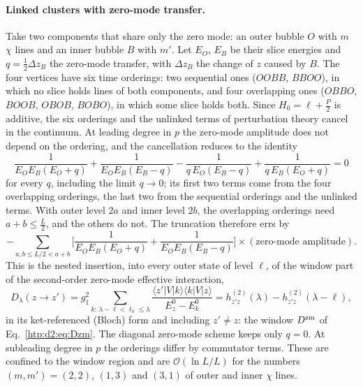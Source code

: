 \paragraph{Linked clusters with zero-mode transfer.} Take two components that share only the zero mode: an outer bubble $O$
with $m$ $\chi$ lines and an inner bubble $B$ with $m'$. Let $E_O$, $E_B$ be their slice energies and $q=\frac12\Delta z_B$ the
zero-mode transfer, with $\Delta z_B$ the change of $z$ caused by $B$. The four vertices
have six time orderings: two sequential ones ($OOBB$, $BBOO$), in which no slice holds lines of both components, and four
overlapping ones ($OBBO$, $BOOB$, $OBOB$, $BOBO$), in which some slice holds both. Since $H_0=\ell+\frac P2$ is additive, the
six orderings and the unlinked terms of perturbation theory cancel in the continuum. At leading degree in $p$ the zero-mode
amplitude does not depend on the ordering, and the cancellation reduces to the identity
\begin{equation}
 \frac1{E_OE_B(E_O+q)}+\frac1{E_OE_B(E_B-q)}-\frac1{q\,E_O(E_B-q)}+\frac1{q\,E_B(E_O+q)}=0
\end{equation}
for every $q$, including the limit $q\to0$; its first two terms come from the four overlapping orderings, the last two from
the sequential orderings and the unlinked terms. With outer level $2a$ and inner level $2b$, the overlapping orderings need
$a+b\le\frac L2$, and the others do not. The truncation therefore errs by
\begin{equation}
 -\sum_{a,b\le L/2<a+b}\Big[\frac1{E_OE_B(E_O+q)}+\frac1{E_OE_B(E_B-q)}\Big]\times(\text{zero-mode amplitude}).
\end{equation}
This is the nested insertion, into every outer state of level $\ell$, of the window part of the second-order zero-mode
effective interaction,
\begin{equation}
 D_\lambda(z\to z')=g_1^2\sum_{k:\,\lambda-\ell<\ell_k\le\lambda}\frac{\langle z'|V|k\rangle\langle k|V|z\rangle}{E^0_z-E^0_k}
 =h^{(2)}_{z'z}(\lambda)-h^{(2)}_{z'z}(\lambda-\ell),
 \label{htp:d2:eq:Dwindow}
\end{equation}
in its ket-referenced (Bloch) form and including $z'\neq z$: the window $D^{\rm zm}$ of Eq.~\eqref{htp:d2:eq:Dzm}. The diagonal
zero-mode scheme keeps only $q=0$. At subleading degree in $p$ the orderings differ by commutator terms. These are confined to
the window region and are $\mathcal O(\ln L/L)$ for the numbers $(m,m')=(2,2)$, $(1,3)$ and $(3,1)$ of outer and inner $\chi$
lines.

